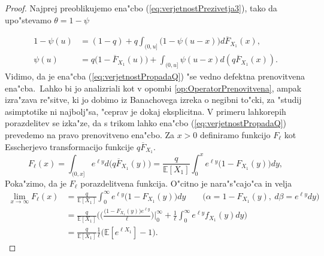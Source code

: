 \documentclass[12pt, a4paper, reqno]{amsart}
\theoremstyle{definition}
\theoremstyle{plain}
\newcommand{\E}{\mathbb{E}}
\newcommand{\1}{\mathds{1}}
\begin{document}
            \begin{proof} 
                Najprej preoblikujemo ena"cbo (\ref{eq:verjetnostPrezivetja3}), tako da 
                upo"stevamo $\theta = 1 - \psi$

                \begin{align}
                    1 - \psi(u) &= (1 - q) + q\int_{(0, u]}\bigl(1 - \psi(u - x)\bigr)d\overline{F}_{X_1}(x), \nonumber \\
                    \psi(u) &= q\bigl(1 - \overline{F}_{X_1}(u)\bigr) + \int_{(0, u]}\psi(u - x)d\left(q\overline{F}_{X_1}(x)\right). \label{eq:verjetnostPropadaQ}
                \end{align}
                Vidimo, da je ena"cba (\ref{eq:verjetnostPropadaQ}) "se vedno defektna prenovitvena ena"cba.\ 
                Lahko bi jo analizriali kot v opombi \ref{op:OperatorPrenovitvena}, ampak 
                izra"zava re"sitve, ki jo dobimo iz Banachovega izreka o negibni to"cki, za "studij 
                asimptotike ni najbolj"sa, "ceprav je dokaj eksplicitna. 
                V primeru lahkorepih porazdelitev se izka"ze, da s trikom lahko ena"cbo (\ref{eq:verjetnostPropadaQ}) 
                prevedemo na pravo prenovitveno ena"cbo. Za $x > 0$ 
                definiramo funkcijo $F_\ell$ kot Esscherjevo transformacijo funkcije $q\overline{F}_{X_1}$.
                \begin{equation}
                    F_\ell(x) = \int_{(0, x]}e^{\ell y}d\bigl(q\overline{F}_{X_1}(y)\bigr) = \frac{q}{\E\left[X_1\right]}\int_0^xe^{\ell y}\bigl(1 - F_{X_1}(y)\bigr)dy, 
                    \label{eq:EsscherjevaTransformacija}
                \end{equation}
                Poka"zimo, da je $F_\ell$ porazdelitvena funkcija. O"citno je nara"s"cajo"ca in velja
                \begin{align*}
                    \lim_{x\to\infty}F_\ell(x) &= \frac{q}{\E\left[X_1\right]}\int_0^\infty e^{\ell y} \bigl(1 - F_{X_1}(y)\bigr)dy \qquad \bigl(\alpha = 1 - F_{X_1}(y), \ d\beta = e^{\ell y}dy\bigr)\\
                                               &= \frac{q}{\E\left[X_1\right]}\biggl(\biggl(\frac{\bigl(1 - F_{X_1}(y)\bigr)e^{\ell y}}{\ell}\biggr)\Big|_{0}^{\infty} + \frac{1}{\ell}\int_0^\infty e^{\ell y}f_{X_1}(y)dy\biggr) \\
                                               &= \frac{q}{\E\left[X_1\right]}\frac{1}{\ell}\biggl(\E\left[e^{\ell X_1}\right] - 1\biggr).
                \end{align*}

\end{proof}
\end{document}
